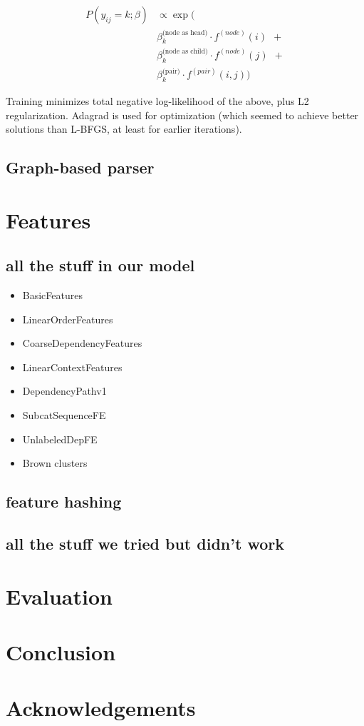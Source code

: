 \documentclass[11pt]{article}
\begin{document}
\begin{align*} 
  P(y_{ij}=k; \beta) & \propto 
  \exp \big( \\
  &
  \beta^{\text{(node as head)}}_k \cdot f^{(node)}(i)
  \ \ + \\ 
  &
  \beta^{\text{(node as child)}}_k \cdot f^{(node)}(j)
  \ \ + \\
  &
  \beta^{\text{(pair)}}_k \cdot f^{(pair)}(i,j)
    \big)
\end{align*}

Training minimizes total negative log-likelihood of the above,
plus L2 regularization.  Adagrad is used for optimization (which seemed to achieve better solutions than L-BFGS, at least for earlier iterations).


\subsection{Graph-based parser} \label{s:graphparser}


\section{Features}

\subsection{all the stuff in our model}

\begin{itemize}
\item BasicFeatures
\item LinearOrderFeatures
\item CoarseDependencyFeatures
\item LinearContextFeatures
\item DependencyPathv1
\item SubcatSequenceFE
\item UnlabeledDepFE
\item Brown clusters
\end{itemize}
\subsection{feature hashing}

\subsection{all the stuff we tried but didn't work}


\section{Evaluation}

\section{Conclusion}

\nocite{flanigan-etal:ACL2014}



\section*{Acknowledgements}



\end{document}
